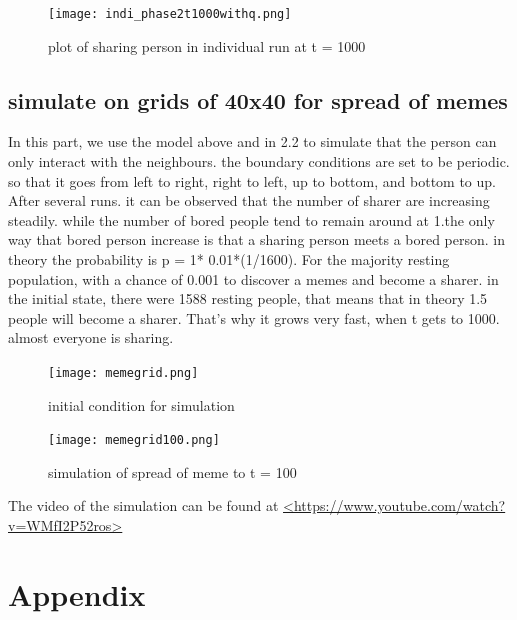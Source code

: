\documentclass[12pt]{article}
\begin{document}
\begin{figure}[H] %
\centering
\texttt{[image: indi\_phase2t1000withq.png]}
\caption{plot of sharing person in individual run at t = 1000 }
\label{fig:phasetransition2indi1000}
\end{figure}

\subsection{simulate on grids of 40x40 for spread of memes}
In this part, we use the model above and in 2.2 to simulate that the person can only interact with the neighbours. the boundary conditions are set to be periodic. so that it goes from left to right, right to left, up to bottom, and bottom to up. After several runs. it can be observed that the number of sharer are increasing steadily. while the number of bored people tend to remain around at 1.the only way that bored person increase is that a sharing person meets a bored person. in theory the probability is p = 1* 0.01*(1/1600). For the majority resting population, with a chance of 0.001 to discover a memes and become a sharer. in the initial state, there were 1588 resting people, that means that in theory 1.5 people will become a sharer. That's why it grows very fast, when t gets to 1000. almost everyone is sharing. 

\begin{figure}[H] %
\centering
\texttt{[image: memegrid.png]}
\caption{initial condition for simulation}
\label{fig:memegrid0}
\end{figure}

\begin{figure}[H] %
\centering
\texttt{[image: memegrid100.png]}
\caption{simulation of spread of meme to t = 100}
\label{fig:memegrid100}
\end{figure}

The video of the simulation can be found at 
\url{<https://www.youtube.com/watch?v=WMfI2P52ros>}

\newpage
\section{Appendix}
\end{document}
